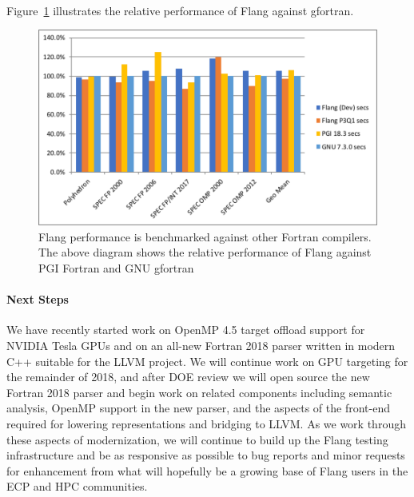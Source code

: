 \

Figure~\ref{fig:flang-performance} illustrates the relative performance of Flang against gfortran.

\begin{figure}[htb]
	\centering
	\includegraphics[width=6in]{projects/2.3.5-Ecosystem/2.3.5.06-Flang/flang-performance}
	\caption{\label{fig:flang-performance}Flang performance is benchmarked against other Fortran compilers. The above diagram shows the relative performance of Flang against PGI Fortran and GNU gfortran}
\end{figure}

\paragraph{Next Steps}
We have recently started work on OpenMP 4.5 target offload support for NVIDIA Tesla
GPUs and on an all-new Fortran 2018 parser written in modern C++ suitable for the LLVM project.
We will continue work on GPU targeting for the remainder of 2018, and after DOE review we
will open source the new Fortran 2018 parser and begin work on related components
including semantic analysis, OpenMP support in the new parser, and the aspects of
the front-end required for lowering representations and bridging to LLVM.  As we
work through these aspects of modernization, we will continue to build up the Flang
testing infrastructure and be as responsive as possible to bug reports and minor
requests for enhancement from what will hopefully be a growing base of Flang users
in the ECP and HPC communities.
